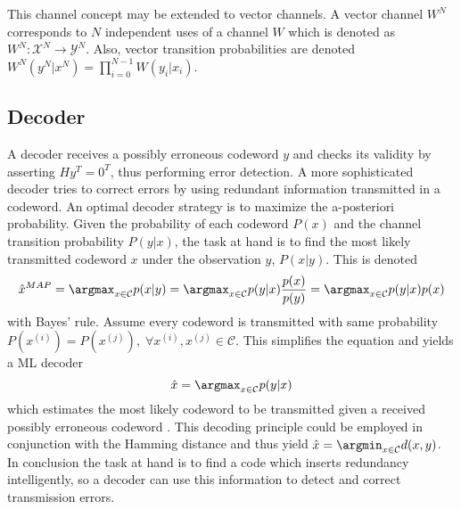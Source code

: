 This channel concept may be extended to vector channels.
A vector channel $W^N$ corresponds to $N$ independent uses of a channel $W$ which is denoted as $W^N : \mathcal{X}^N \rightarrow \mathcal{Y}^N$.
Also, vector transition probabilities are denoted $W^N(y^N|x^N) = \prod_{i=0}^{N-1} W(y_i|x_i)$.

\subsection{Decoder}
A decoder receives a possibly erroneous codeword $y$ and checks its validity by asserting $H y^T = 0^T$, thus performing error detection.
A more sophisticated decoder tries to correct errors by using redundant information transmitted in a codeword.
An optimal decoder strategy is to maximize the a-posteriori probability.
Given the probability of each codeword $P(x)$ and the channel transition probability $P(y|x)$, the task at hand is to find the most likely transmitted codeword $x$ under the observation $y$, $P(x|y)$.
This is denoted
\begin{equation}
 \hat{x}^{MAP} = \argmax_{x \in \mathcal{C}} p(x|y) = \argmax_{x \in \mathcal{C}} p(y|x) \frac{p(x)}{p(y)} = \argmax_{x \in \mathcal{C}} p(y|x) p(x)
\end{equation}
with Bayes' rule.
Assume every codeword is transmitted with same probability $P(x^{(i)}) = P(x^{(j)}), \; \forall x^{(i)}, x^{(j)} \in \mathcal{C}$.
This simplifies the equation and yields a \ac{ML} decoder
\begin{equation}
 \hat{x} = \argmax_{x \in \mathcal{C}} p(y|x)
\end{equation}
which estimates the most likely codeword to be transmitted given a received possibly erroneous codeword \cite{Richardson:2008:MCT}.
This decoding principle could be employed in conjunction with the Hamming distance and thus yield $\hat{x} = \argmin_{x \in \mathcal{C}} d(x, y)$.
In conclusion the task at hand is to find a code which inserts redundancy intelligently, so a decoder can use this information to detect and correct transmission errors.

